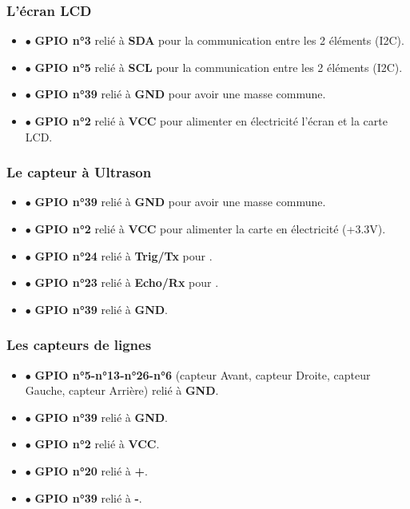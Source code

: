         \subsubsection{L'écran LCD}
                \begin{itemize}
                \item $\bullet$ \textbf{GPIO n°3} relié à \textbf{SDA} pour la communication entre les 2 éléments (I2C).
                \item $\bullet$ \textbf{GPIO n°5} relié à \textbf{SCL} pour la communication entre les 2 éléments (I2C).
                \item $\bullet$ \textbf{GPIO n°39} relié à \textbf{GND} pour avoir une masse commune.
                \item $\bullet$ \textbf{GPIO n°2} relié à \textbf{VCC} pour alimenter en électricité l'écran et la carte LCD.
                \end{itemize}
        \subsubsection{Le capteur à Ultrason}
                \begin{itemize}
                \item $\bullet$ \textbf{GPIO n°39} relié à \textbf{GND} pour avoir une masse commune.
                \item $\bullet$ \textbf{GPIO n°2} relié à \textbf{VCC} pour alimenter la carte en électricité (+3.3V).
                \item $\bullet$ \textbf{GPIO n°24} relié à \textbf{Trig/Tx} pour .
                \item $\bullet$ \textbf{GPIO n°23} relié à \textbf{Echo/Rx} pour .
                \item $\bullet$ \textbf{GPIO n°39} relié à \textbf{GND}.
                \end{itemize}

        \subsubsection{Les capteurs de lignes}
                \begin{itemize}
                \item $\bullet$ \textbf{GPIO n°5-n°13-n°26-n°6} (capteur Avant, capteur Droite, capteur Gauche, capteur Arrière) relié à \textbf{GND}.
                \item $\bullet$ \textbf{GPIO n°39} relié à \textbf{GND}.
                \item $\bullet$ \textbf{GPIO n°2} relié à \textbf{VCC}.

                \item $\bullet$ \textbf{GPIO n°20} relié à \textbf{+}.
                \item $\bullet$ \textbf{GPIO n°39} relié à \textbf{-}.

                \end{itemize}
        \vspace{5mm}

